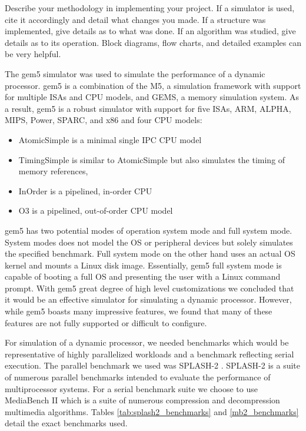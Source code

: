 Describe your methodology in implementing your project. If a simulator is used,
cite it accordingly and detail what changes you made. If a structure was implemented, give details
as to what was done. If an algorithm was studied, give details as to its
operation. Block diagrams, flow charts, and detailed examples can be very helpful. 

The gem5 \cite{gem5} simulator was used to simulate the performance of a dynamic processor. gem5 is a combination of the M5, a simulation framework with support for multiple ISAs and CPU models, and GEMS, a memory simulation system. As a result, gem5 is a robust simulator with support for five ISAs, ARM, ALPHA, MIPS, Power, SPARC, and x86 and four CPU models:

\begin{itemize}
\item AtomicSimple is a minimal single IPC CPU model
\item TimingSimple is similar to AtomicSimple but also simulates the timing of memory references,
\item InOrder is a pipelined, in-order CPU
\item O3 is a pipelined, out-of-order CPU model
\end{itemize}

gem5 has two potential modes of operation system mode and full system mode. System modes does not model the OS or peripheral devices but solely simulates the specified benchmark. Full system mode on the other hand uses an actual OS kernel and mounts a Linux disk image. Essentially, gem5 full system mode is capable of booting a full OS and presenting the user with a Linux command prompt. With gem5 great degree of high level customizations we concluded that it would be an effective simulator for simulating a dynamic processor. However, while gem5 boasts many impressive features, we found that many of these features are not fully supported or difficult to configure.

For simulation of a dynamic processor, we needed benchmarks which would be representative of highly parallelized workloads and a benchmark reflecting serial execution. The parallel benchmark we used was SPLASH-2 \cite{splash2}. SPLASH-2 is a suite of numerous parallel benchmarks intended to evaluate the performance of multiprocessor systems. For a serial benchmark suite we choose to use MediaBench II \cite{mb2} which is a suite of numerous compression and decompression multimedia algorithms. Tables \ref{tab:splash2_benchmarks} and \ref{mb2_benchmarks} detail the exact benchmarks used.

